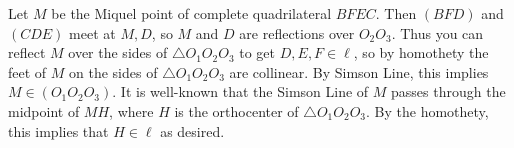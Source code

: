 Let $M$ be the Miquel point of complete quadrilateral $BFEC$. Then $(BFD)$ and $(CDE)$ meet at $M,D$, so $M$ and $D$ are reflections over $O_2O_3$. Thus you can reflect $M$ over the sides of $\triangle{O_1O_2O_3}$ to get $D,E,F\in\ell$, so by homothety the feet of $M$ on the sides of $\triangle{O_1O_2O_3}$ are collinear. By Simson Line, this implies $M\in(O_1O_2O_3)$. It is well-known that the Simson Line of $M$ passes through the midpoint of $MH$, where $H$ is the orthocenter of $\triangle{O_1O_2O_3}$. By the homothety, this implies that $H\in\ell$ as desired.